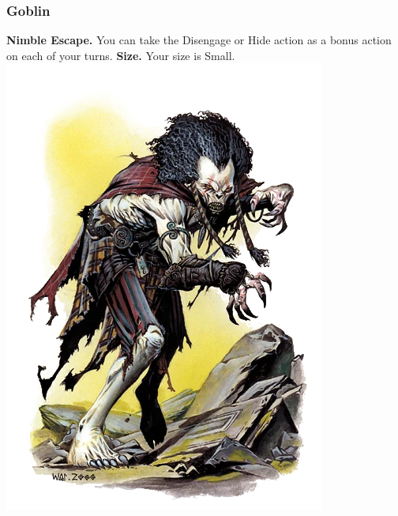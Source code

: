 \documentclass[a4paper,10pt,twoside,twocolumn]{dndbook} %
\begin{document}
	\subsubsection{Goblin}
	\textbf{Nimble Escape.} You can take the Disengage or Hide action as a bonus action on each of your turns.\linebreak
	\textbf{Size.} Your size is Small.
	\includegraphics[width=\linewidth]{Wight2.png}
	
\end{document}

